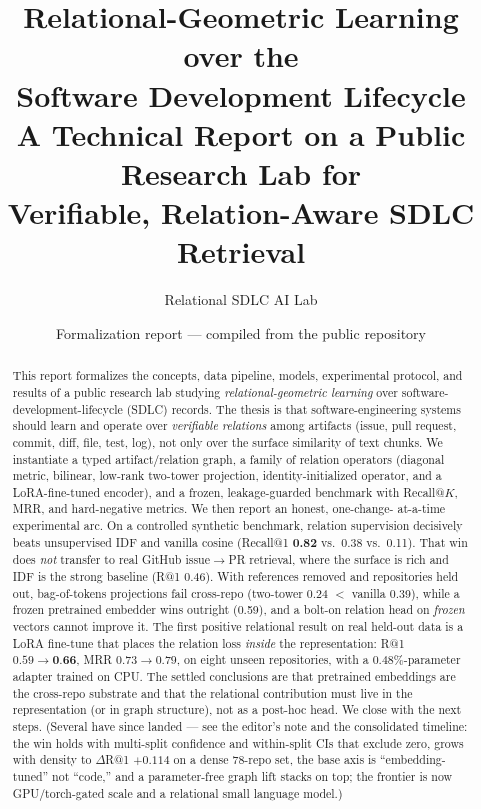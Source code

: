 \documentclass[11pt]{article}
\title{\textbf{Relational-Geometric Learning over the\\Software Development Lifecycle}\\[0.4em]
\large A Technical Report on a Public Research Lab for\\Verifiable, Relation-Aware SDLC Retrieval}
\author{Relational SDLC AI Lab}
\date{Formalization report --- compiled from the public repository}
\begin{document}
\maketitle

\begin{abstract}
This report formalizes the concepts, data pipeline, models, experimental
protocol, and results of a public research lab studying \emph{relational-geometric
learning} over software-development-lifecycle (SDLC) records. The thesis is that
software-engineering systems should learn and operate over \emph{verifiable
relations} among artifacts (issue, pull request, commit, diff, file, test, log),
not only over the surface similarity of text chunks. We instantiate a typed
artifact/relation graph, a family of relation operators (diagonal metric,
bilinear, low-rank two-tower projection, identity-initialized operator, and a
LoRA-fine-tuned encoder), and a frozen, leakage-guarded benchmark with
Recall@$K$, MRR, and hard-negative metrics. We then report an honest, one-change-
at-a-time experimental arc. On a controlled synthetic benchmark, relation
supervision decisively beats unsupervised IDF and vanilla cosine (Recall@1
\textbf{0.82} vs.\ 0.38 vs.\ 0.11). That win does \emph{not} transfer to real
GitHub issue$\to$PR retrieval, where the surface is rich and IDF is the strong
baseline (R@1 0.46). With references removed and repositories held out,
bag-of-tokens projections fail cross-repo (two-tower 0.24 $<$ vanilla 0.39), while
a frozen pretrained embedder wins outright (0.59), and a bolt-on relation head on
\emph{frozen} vectors cannot improve it. The first positive relational result on
real held-out data is a LoRA fine-tune that places the relation loss \emph{inside}
the representation: R@1 $0.59 \to \textbf{0.66}$, MRR $0.73 \to 0.79$, on eight
unseen repositories, with a $0.48\%$-parameter adapter trained on CPU. The settled
conclusions are that pretrained embeddings are the cross-repo substrate and that
the relational contribution must live in the representation (or in graph
structure), not as a post-hoc head. We close with the next steps. (Several have
since landed --- see the editor's note and the consolidated timeline: the win holds
with multi-split confidence and within-split CIs that exclude zero, grows with
density to $\Delta$R@1 $+0.114$ on a dense 78-repo set, the base axis is
``embedding-tuned'' not ``code,'' and a parameter-free graph lift stacks on top; the
frontier is now GPU/torch-gated scale and a relational small language model.)
\end{abstract}
\end{document}
